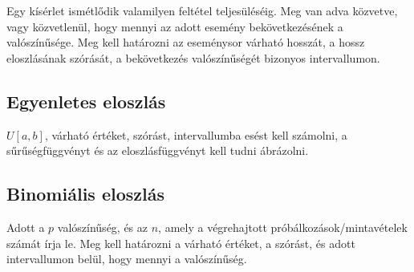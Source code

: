 \documentclass[a4paper]{article}
\begin{document}
Egy kísérlet ismétlődik valamilyen feltétel teljesüléséig.
Meg van adva közvetve, vagy közvetlenül, hogy mennyi az adott esemény bekövetkezésének a valószínűsége.
Meg kell határozni az eseménysor várható hosszát, a hossz eloszlásának szórását, a bekövetkezés valószínűségét bizonyos intervallumon.

\subsection{Egyenletes eloszlás}

$U[a, b]$, várható értéket, szórást, intervallumba esést kell számolni, a sűrűségfüggvényt és az eloszlásfüggvényt kell tudni ábrázolni.

\subsection{Binomiális eloszlás}

Adott a $p$ valószínűség, és az $n$, amely a végrehajtott próbálkozások/mintavételek számát írja le.
Meg kell határozni a várható értéket, a szórást, és adott intervallumon belül, hogy mennyi a valószínűség.
\end{document}
